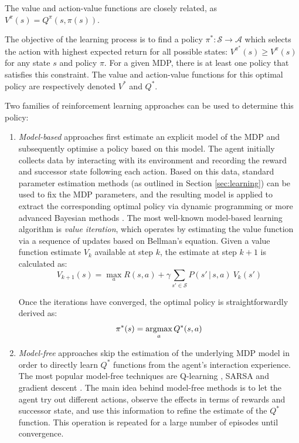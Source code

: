 The value and action-value functions are closely related, as $V^{\pi}(s) = Q^{\pi}(s,\pi(s))$.

The objective of the learning process is to find a policy $\pi^*: \mathcal{S} \rightarrow \mathcal{A}$ which selects the action with highest expected return for all possible states: $V^{\pi^*}(s) \geq V^{\pi}(s)$ for any state $s$ and policy $\pi$.  For a given MDP, there is at least one policy that satisfies this constraint. The value and action-value functions for this optimal policy are respectively denoted $V^*$ and $Q^*$. 

Two families of reinforcement learning approaches can be used to determine this policy: \begin{enumerate}
\item  \textit{Model-based} approaches first estimate an explicit model of the MDP and subsequently optimise a policy based on this model. The agent initially collects data by interacting with its environment and recording the reward and successor state following each action. Based on this data, standard parameter estimation methods (as outlined in Section \ref{sec:learning}) can be used to fix the MDP parameters, and the resulting model is  applied to extract the corresponding optimal policy via dynamic programming \citep{Bertsekas:1996} or more advanced Bayesian methods \citep{DeardenFA99}.  The most well-known model-based learning algorithm is \textit{value iteration}, which operates by estimating the value function via a sequence of updates based on Bellman's equation. Given a value function estimate $V_k$ available at step $k$, the estimate at step $k+1$ is calculated as: 
\begin{equation}
V_{k+1}(s) = \max_a R(s,a) + \gamma \sum_{s' \in \mathcal{S}} P(s' \, | \, s, a) \ V_k(s')
\end{equation}

Once the iterations have converged, the optimal policy is straightforwardly derived as:
\begin{equation}
\pi^*(s) = \argmax_a Q^*(s,a)
\end{equation}

\item \textit{Model-free} approaches skip the estimation of the underlying MDP model in order to directly learn $Q^*$ functions from the agent's interaction experience.  The most popular model-free techniques are Q-learning \citep{watkins92}, SARSA \citep{rummery:phd95} and gradient descent \citep{Sutton:2009}.  The main idea behind model-free methods is to let the agent try out different actions, observe the effects in terms of rewards and successor state, and use this information to refine the estimate of the $Q^*$ function. This operation is repeated for a large number of episodes until convergence.  
\end{enumerate}

